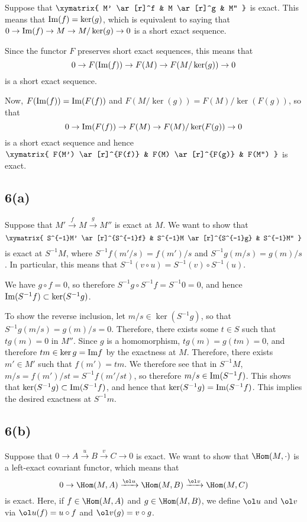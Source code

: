 \documentclass[12pt, reqno]{amsart}
\begin{document}
Suppose that 
$ 
\xymatrix{
M' \ar[r]^f & M \ar[r]^g & M'' 
}
$
is exact. This means that $\mathrm{Im}(f) = \ker(g)$, which 
is equivalent to saying that 
$0 \to \mathrm{Im}(f) \to M \to M/\ker(g) \to 0$
is a short exact sequence.

Since the functor $F$ preserves short exact sequences, this means that
$$0 \to F(\mathrm{Im}(f)) \to F(M) \to F(M / \ker(g)) \to 0$$ is a short exact sequence.

Now, $F(\mathrm{Im}(f)) = \mathrm{Im}(F(f))$ and $F ( M / \ker(g)) = F(M) / \ker(F(g))$, so that
$$0 \to \mathrm{Im}(F(f)) \to F(M) \to F(M) / \ker(F(g)) \to 0$$ is a short exact
sequence and hence 
$
\xymatrix{
F(M') \ar[r]^{F(f)} & F(M) \ar[r]^{F(g)} & F(M'') 
}
$
is exact.



\subsection*{6(a)}

Suppose that $M' \xrightarrow f M \xrightarrow g  M''$ is exact at $M$.
We want to show that 
\[ 
\xymatrix{
S^{-1}M' \ar[r]^{S^{-1}f} & S^{-1}M \ar[r]^{S^{-1}g} & S^{-1}M'' 
}
\] 
is exact at $S^{-1}M$, where
$S^{-1}f(m'/s) = f(m')/s$ and $S^{-1}g(m/s) = g(m)/s$. In particular, this
means that $S^{-1} (v \circ u) = S^{-1}(v) \circ S^{-1}(u)$.

We have $g \circ f = 0$, so therefore 
$S^{-1}g \circ S^{-1}f = S^{-1}0 = 0$, and hence 
$\mathrm{Im}(S^{-1}f) \subset \ker(S^{-1}g)$.

To show the reverse inclusion, let $m/s \in \ker(S^{-1}g)$, so that
$S^{-1}g(m/s) = g(m)/s = 0$. Therefore, there exists some $t \in S$ such that
$t g(m) = 0$ in $M''$. Since $g$ is a homomorphism, $tg(m) = g(tm) = 0$, and
therefore $tm \in \ker g = \mathrm{Im} f$ by the exactness at $M$. Therefore, there
exists $m' \in M'$ such that $f(m') = tm$.
We therefore see that in $S^{-1}M$, 
$m/s = f(m')/st = S^{-1}f(m'/st)$, so therefore $m/s \in \mathrm{Im}(S^{-1}f)$. This
shows that $\ker(S^{-1}g) \subset \mathrm{Im}(S^{-1}f)$, and hence that
$\ker (S^{-1}g) = \mathrm{Im} (S^{-1}f)$. This implies the desired exactness at 
$S^{-1}m$.


\subsection*{6(b)}

Suppose that $0 \to A \xrightarrow u B \xrightarrow v C \to 0$ is exact.
We want to show that $\Hom(M, \cdot)$ is a left-exact covariant functor, 
which means that 
$$
0 \to \Hom(M, A) \xrightarrow{\ol u} \Hom(M, B) \xrightarrow{\ol v} \Hom(M, C)
$$ 
is exact. Here, if $f \in \Hom(M,A)$ and $g \in \Hom(M, B)$, we define 
$\ol u$ and $\ol v$ via $\ol u(f) = u \circ f$ and 
$\ol v(g) = v \circ g$.
\end{document}
